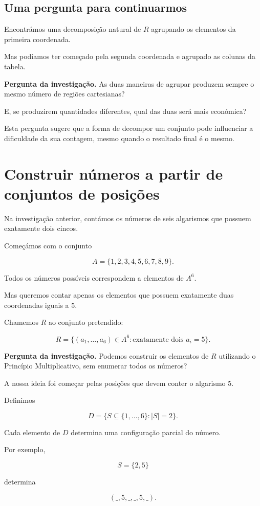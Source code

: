 \documentclass[11pt,a4paper,oneside]{book}
\newcommand{\Pergunta}[1]{\begin{perguntabox}\textbf{Pergunta da investigação.} #1\end{perguntabox}}
\begin{document}
\subsection*{Uma pergunta para continuarmos}

Encontrámos uma decomposição
natural de $R$ agrupando
os elementos da primeira coordenada.

Mas podíamos ter começado
pela segunda coordenada
e agrupado as colunas da tabela.

\Pergunta{As duas maneiras de agrupar
produzem sempre o mesmo número
de regiões cartesianas?}

E, se produzirem quantidades
diferentes, qual das duas
será mais económica?

Esta pergunta sugere que
a forma de decompor um conjunto
pode influenciar a dificuldade
da sua contagem, mesmo quando
o resultado final é o mesmo.

\section*{Construir números a partir de conjuntos de posições}

Na investigação anterior, contámos
os números de seis algarismos
que possuem exatamente dois cincos.

Começámos com o conjunto

\[
A=\{1,2,3,4,5,6,7,8,9\}.
\]

Todos os números possíveis correspondem
a elementos de $A^6$.

Mas queremos contar apenas os elementos
que possuem exatamente duas coordenadas
iguais a $5$.

Chamemos $R$ ao conjunto pretendido:

\[
R=\{(a_1,\ldots,a_6)\in A^6:
\text{exatamente dois }a_i=5\}.
\]

\Pergunta{Podemos construir os elementos
de $R$ utilizando o Princípio Multiplicativo,
sem enumerar todos os números?}

A nossa ideia foi começar pelas posições
que devem conter o algarismo $5$.

Definimos

\[
D=\{S\subseteq\{1,\ldots,6\}:|S|=2\}.
\]

Cada elemento de $D$ determina
uma configuração parcial do número.

Por exemplo,

\[
S=\{2,5\}
\]

determina

\[
(\_,5,\_,\_,5,\_).
\]
\end{document}
